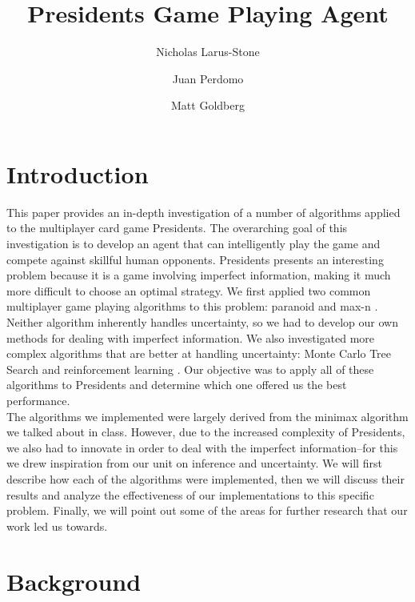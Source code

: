 \documentclass[11pt]{article}
\title{Presidents Game Playing Agent}
\author{Nicholas Larus-Stone \and Juan Perdomo \and Matt Goldberg}
\begin{document}
\maketitle{}

\section{Introduction}

This paper provides an in-depth investigation of a number of algorithms applied to the multiplayer card game Presidents. The overarching goal of this investigation is to develop an agent that can intelligently play the game and compete against skillful human opponents.   Presidents presents an interesting problem because it is a game involving imperfect information, making it much more difficult to choose an optimal strategy. We first applied two common multiplayer game playing algorithms to this problem: paranoid and max-n \cite{sturtevant03a}. Neither algorithm inherently handles uncertainty, so we had to develop our own methods for dealing with imperfect information. We also investigated more complex algorithms that are better at handling uncertainty: Monte Carlo Tree Search \cite{browne12} and reinforcement learning \cite{fujita03}. Our objective was to apply all of these algorithms to Presidents and determine which one offered us the best performance.\\

The algorithms we implemented were largely derived from the minimax algorithm we talked about in class. However, due to the increased complexity of Presidents, we also had to innovate in order to deal with the imperfect information--for this we drew inspiration from our unit on inference and uncertainty. We will first describe how each of the algorithms were implemented, then we will discuss their results and analyze the effectiveness of our implementations to this specific problem. Finally, we will point out some of the areas for further research that our work led us towards.

\section{Background}
\end{document}
